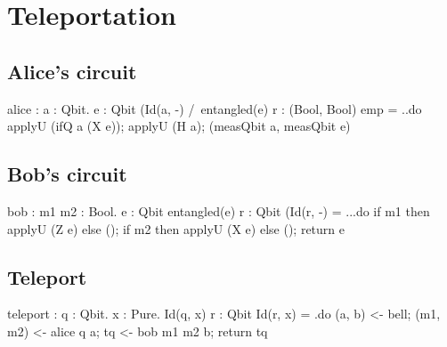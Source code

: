 \documentclass[acmsmall,nonacm,timestamp]{acmart}
\newcommand{\todo}[1]{\textcolor{red}{#1}}
\begin{document}
\section{Teleportation}
\label{app:teleport}
\subsection{Alice's circuit}
\begin{QCode}
alice : \Pi a : Qbit. \Pi e : Qbit
        {(Id(a, -) /\ entangled(e)}
           r : (Bool, Bool)
        {emp}
      = \a.\e.do applyU (ifQ a (X e));
                 applyU (H a);
                 (measQbit a, measQbit e)
\end{QCode}

\subsection{Bob's circuit}
\begin{QCode}
bob : \Pi m1 m2 : Bool. \Pi e : Qbit
      {entangled(e)}
         r : Qbit
      {(Id(r, -)}
      = ..\e.do if m1 then applyU (Z e) else ();
                      if m2 then applyU (X e) else ();
                      return e
\end{QCode}

\subsection{Teleport}
\begin{QCode}
teleport : \Pi q : Qbit. x : Pure.
      {Id(q, x)}
         r : Qbit
      {Id(r, x)}
      = \q.do (a, b) <- bell;
              (m1, m2) <- alice q a;
              tq <- bob m1 m2 b;
              return tq
\end{QCode}

\end{document}
